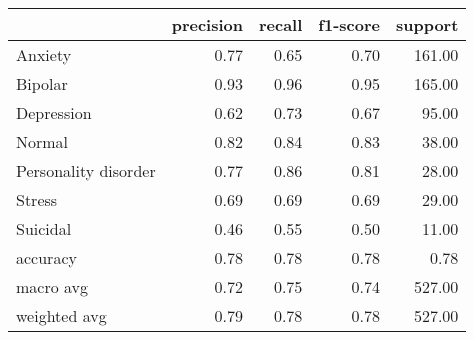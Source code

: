 \begin{tabular}{lrrrr}
\toprule
 & precision & recall & f1-score & support \\
\midrule
Anxiety & 0.77 & 0.65 & 0.70 & 161.00 \\
Bipolar & 0.93 & 0.96 & 0.95 & 165.00 \\
Depression & 0.62 & 0.73 & 0.67 & 95.00 \\
Normal & 0.82 & 0.84 & 0.83 & 38.00 \\
Personality disorder & 0.77 & 0.86 & 0.81 & 28.00 \\
Stress & 0.69 & 0.69 & 0.69 & 29.00 \\
Suicidal & 0.46 & 0.55 & 0.50 & 11.00 \\
accuracy & 0.78 & 0.78 & 0.78 & 0.78 \\
macro avg & 0.72 & 0.75 & 0.74 & 527.00 \\
weighted avg & 0.79 & 0.78 & 0.78 & 527.00 \\
\bottomrule
\end{tabular}
